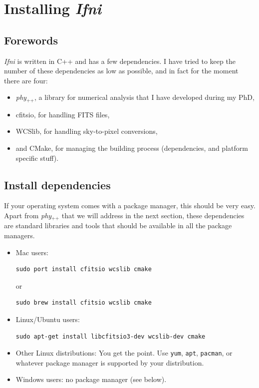 \documentclass[12pt,a4paper]{article}
\newcommand{\phypp}{\textit{phy}$_{\text{++}}$\xspace}
\newcommand{\ifni}{\textit{Ifni}\xspace}
\begin{document}
\newpage

\section{Installing \ifni}

\subsection{Forewords}

\ifni is written in C++ and has a few dependencies. I have tried to keep the number of these dependencies as low as possible, and in fact for the moment there are four:

\begin{itemize}
\item \phypp, a library for numerical analysis that I have developed during my PhD,
\item cfitsio, for handling FITS files,
\item WCSlib, for handling sky-to-pixel conversions,
\item and CMake, for managing the building process (dependencies, and platform specific stuff).
\end{itemize}

\subsection{Install dependencies}

If your operating system comes with a package manager, this should be very easy. Apart from \phypp that we will address in the next section, these dependencies are standard libraries and tools that should be available in all the package managers.

\begin{itemize}
\item Mac users:
\begin{verbatim}
sudo port install cfitsio wcslib cmake
\end{verbatim}
or
\begin{verbatim}
sudo brew install cfitsio wcslib cmake
\end{verbatim}
\item Linux/Ubuntu users:
\begin{verbatim}
sudo apt-get install libcfitsio3-dev wcslib-dev cmake
\end{verbatim}
\item Other Linux distributions: You get the point. Use \texttt{yum}, \texttt{apt}, \texttt{pacman}, or whatever package manager is supported by your distribution.
\item Windows users: no package manager (see below).
\end{itemize}
\end{document}
